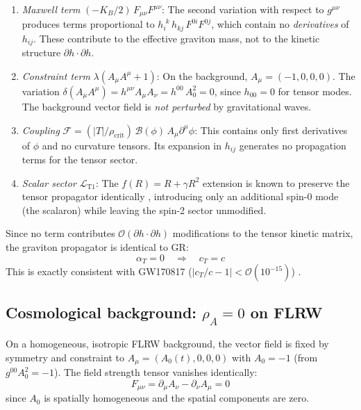 \documentclass[aps,prd,twocolumn,superscriptaddress,nofootinbib]{revtex4-2}
\begin{document}
\begin{enumerate}
\item \textit{Maxwell term} $(-K_B/2)\,F_{\mu\nu}F^{\mu\nu}$: The second variation with respect to $g^{\mu\nu}$ produces terms proportional to $h_{i}^{\phantom{i}k}\,h_{kj}\,F^{0i}F^{0j}$, which contain no \textit{derivatives} of $h_{ij}$. These contribute to the effective graviton mass, not to the kinetic structure $\partial h \cdot \partial h$.

\item \textit{Constraint term} $\lambda(A_\mu A^\mu + 1)$: On the background, $A_\mu = (-1, 0, 0, 0)$. The variation $\delta(A_\mu A^\mu) = h^{\mu\nu}A_\mu A_\nu = h^{00}\,A_0^2 = 0$, since $h_{00} = 0$ for tensor modes. The background vector field is \textit{not perturbed} by gravitational waves.

\item \textit{Coupling} $\mathcal{F} = (|T|/\rho_{\mathrm{crit}})\,\mathcal{B}(\phi)\,A_\mu\partial^\mu\phi$: This contains only first derivatives of $\phi$ and no curvature tensors. Its expansion in $h_{ij}$ generates no propagation terms for the tensor sector.

\item \textit{Scalar sector} $\mathcal{L}_{\mathrm{T1}}$: The $f(R) = R + \gamma R^2$ extension is known to preserve the tensor propagator identically \cite{Starobinsky1980}, introducing only an additional spin-0 mode (the scalaron) while leaving the spin-2 sector unmodified.
\end{enumerate}

Since no term contributes $\mathcal{O}(\partial h \cdot \partial h)$ modifications to the tensor kinetic matrix, the graviton propagator is identical to GR:
\begin{equation}
\alpha_T = 0 \quad\Longrightarrow\quad c_T = c
\label{eq:alpha_T}
\end{equation}
This is exactly consistent with GW170817 ($|c_T/c - 1| < \mathcal{O}(10^{-15})$) \cite{Abbott2017}.

\subsection{Cosmological background: $\rho_A = 0$ on FLRW}
\label{sec:rho_A}

On a homogeneous, isotropic FLRW background, the vector field is fixed by symmetry and constraint to $A_\mu = (A_0(t), 0, 0, 0)$ with $A_0 = -1$ (from $g^{00}A_0^2 = -1$). The field strength tensor vanishes identically:
\begin{equation}
F_{\mu\nu} = \partial_\mu A_\nu - \partial_\nu A_\mu = 0
\end{equation}
since $A_0$ is spatially homogeneous and the spatial components are zero.
\end{document}
